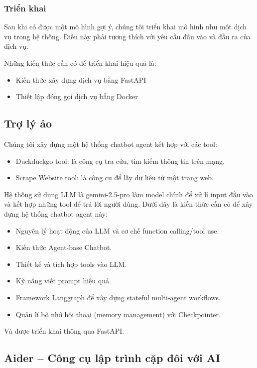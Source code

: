 \subsubsection{Triển khai}
Sau khi có được một mô hình gợi ý, chúng tôi triển khai mô hình như một dịch vụ trong hệ thống. Điều này phải tương thích với yêu cầu đầu vào và đầu ra của 
dịch vụ.

Những kiến thức cần có để triển khai hiệu quả là:
\begin{itemize}
    \item Kiến thức xây dựng dịch vụ bằng FastAPI
    \item Thiết lập đóng gọi dịch vụ bằng Docker
\end{itemize}

\subsection{Trợ lý ảo}
 
Chúng tôi xây dựng một hệ thống chatbot agent kết hợp với các tool:
\begin{itemize}
    \item Duckduckgo tool: là công cụ tra cứu, tìm kiếm thông tin trên mạng.
    \item Scrape Website tool: là công cụ để lấy dữ liệu từ một trang web.
\end{itemize}

Hệ thống sử dụng LLM là gemini-2.5-pro làm model chính để xử lí input đầu vào và kết hợp những tool để trả lời người dùng.
Dưới đây là kiến thức cần có để xây dựng hệ thống chatbot agent này:
\begin{itemize}
    \item Nguyên lý hoạt động của LLM và cơ chế function calling/tool use.
    \item Kiến thức Agent-base Chatbot.
    \item Thiết kế và tích hợp tools vào LLM.
    \item Kỹ năng viết prompt hiệu quả.
    \item Framework Langgraph để xây dựng stateful multi-agent workflows.
    \item Quản lí bộ nhớ hội thoại (memory management) với Checkpointer.
\end{itemize}

Và được triển khai thông qua FastAPI.

\subsection{Aider -- Công cụ lập trình cặp đôi với AI}
\label{sec:aider}

